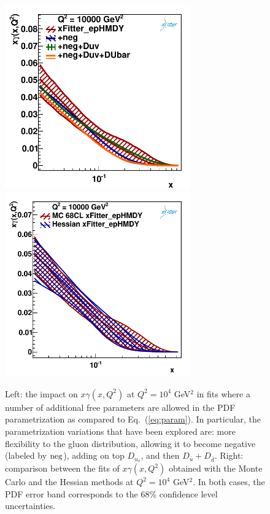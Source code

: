 \begin{figure}[t]
\centering
\includegraphics[width=8cm]{figs/q2_10000_pdf_ph_param_var.pdf}
\includegraphics[width=8cm]{figs/photon_mc_vs_hessian} 
\caption{Left: the impact on $x\gamma(x,Q^2)$ at $Q^2=10^4$ GeV$^2$
  in fits where a number of additional free parameters are allowed
  in the PDF parametrization as compared to Eq.~(\ref{eq:param}).
  In particular, the parametrization variations that have been explored
  are: more flexibility to the gluon distribution, allowing
  it to become negative
 (labeled by ${\rm neg}$), adding on top $D_{u_v}$, and then $D_{\bar{u}}+D_{\bar{d}}$.
 Right: comparison between the fits of $x\gamma(x,Q^2)$ obtained with the
  Monte Carlo and the Hessian methods at $Q^2=10^4$ GeV$^2$.
  In both cases, the PDF error band corresponds to the 68\% confidence
  level uncertainties.  }
\label{fig:param}
\label{fig:photon_mc_vs_hessian}
\end{figure}


